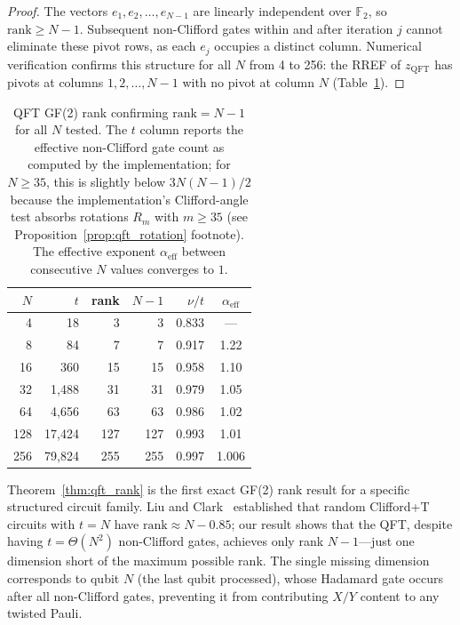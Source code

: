 \documentclass[a4paper,twocolumn,11pt]{quantumarticle}
\begin{document}
\begin{proof}
The vectors $e_1, e_2, \ldots, e_{N-1}$ are linearly independent over $\mathbb{F}_2$, so $\mathrm{rank} \ge N - 1$.
Subsequent non-Clifford gates within and after iteration $j$ cannot eliminate these pivot rows, as each $e_j$ occupies a distinct column.
Numerical verification confirms this structure for all $N$ from 4 to 256: the RREF of $z_{\mathrm{QFT}}$ has pivots at columns $1, 2, \ldots, N-1$ with no pivot at column $N$ (Table~\ref{tab:qft_rank}).
\end{proof}

\begin{table}[t]
\centering
\small
\caption{QFT GF(2) rank confirming $\mathrm{rank} = N - 1$ for all $N$ tested. The $t$ column reports the effective non-Clifford gate count as computed by the implementation; for $N \ge 35$, this is slightly below $3N(N{-}1)/2$ because the implementation's Clifford-angle test absorbs rotations $R_m$ with $m \ge 35$ (see Proposition~\ref{prop:qft_rotation} footnote). The effective exponent $\alpha_{\mathrm{eff}}$ between consecutive $N$ values converges to $1$.}
\label{tab:qft_rank}
\begin{tabular}{@{}rrrrrc@{}}
\toprule
$N$ & $t$ & rank & $N{-}1$ & $\nu/t$ & $\alpha_{\mathrm{eff}}$ \\
\midrule
4 & 18 & 3 & 3 & 0.833 & --- \\
8 & 84 & 7 & 7 & 0.917 & 1.22 \\
16 & 360 & 15 & 15 & 0.958 & 1.10 \\
32 & 1{,}488 & 31 & 31 & 0.979 & 1.05 \\
64 & 4{,}656 & 63 & 63 & 0.986 & 1.02 \\
128 & 17{,}424 & 127 & 127 & 0.993 & 1.01 \\
256 & 79{,}824 & 255 & 255 & 0.997 & 1.006 \\
\bottomrule
\end{tabular}
\end{table}

Theorem~\ref{thm:qft_rank} is the first exact GF(2) rank result for a specific structured circuit family.
Liu and Clark~\cite{Liu2024} established that random Clifford+T circuits with $t = N$ have $\mathrm{rank} \approx N - 0.85$; our result shows that the QFT, despite having $t = \Theta(N^2)$ non-Clifford gates, achieves only rank $N - 1$---just one dimension short of the maximum possible rank.
The single missing dimension corresponds to qubit $N$ (the last qubit processed), whose Hadamard gate occurs after all non-Clifford gates, preventing it from contributing $X/Y$ content to any twisted Pauli.
\end{document}
